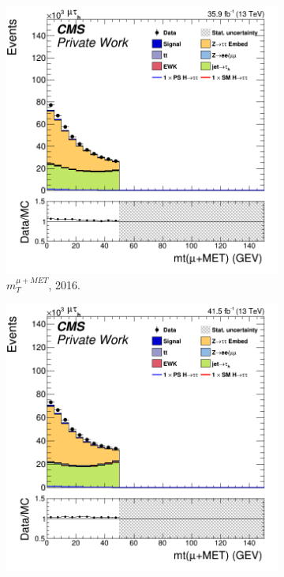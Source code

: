 \begin{figure}
    \begin{subfigure}[b]{0.33\linewidth}
    \centering
    \includegraphics[width=\linewidth]{Chapitre7/Images/CtrlPlots/2016/MuMETmt.png} 
    \caption{$m^{\mu+MET}_T$, 2016.} 
    \vspace{0.5ex}
  \end{subfigure}%
  \begin{subfigure}[b]{0.33\linewidth}
    \centering
    \includegraphics[width=\linewidth]{Chapitre7/Images/CtrlPlots/2017/MuMETmt.png} 

\end{subfigure}
\end{figure}
